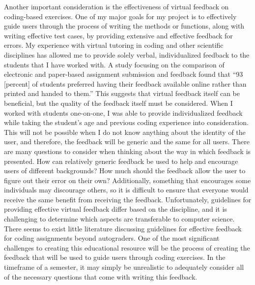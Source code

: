\documentclass[10pt,twocolumn]{article}
\begin{document}
Another important consideration is the effectiveness of virtual feedback on coding-based exercises. One of my major goals for my project is to effectively guide users through the process of writing the methods or functions, along with writing effective test cases, by providing extensive and effective feedback for errors. My experience with virtual tutoring in coding and other scientific disciplines has allowed me to provide solely verbal, individualized feedback to the students that I have worked with. A study focusing on the comparison of electronic and paper-based assignment submission and feedback found that “93 [percent] of students preferred having their feedback available online rather than printed and handed to them.”\cite{Feedback} This suggests that virtual feedback itself can be beneficial, but the quality of the feedback itself must be considered. When I worked with students one-on-one, I was able to provide individualized feedback while taking the student’s age and previous coding experience into consideration. This will not be possible when I do not know anything about the identity of the user, and therefore, the feedback will be generic and the same for all users. There are many questions to consider when thinking about the way in which feedback is presented. How can relatively generic feedback be used to help and encourage users of different backgrounds? How much should the feedback allow the user to figure out their error on their own? Additionally, something that encourages some individuals may discourage others, so it is difficult to ensure that everyone would receive the same benefit from receiving the feedback. Unfortunately, guidelines for providing effective virtual feedback differ based on the discipline, and it is challenging to determine which aspects are transferable to computer science. There seems to exist little literature discussing guidelines for effective feedback for coding assignments beyond autograders. One of the most significant challenges to creating this educational resource will be the process of creating the feedback that will be used to guide users through coding exercises. In the timeframe of a semester, it may simply be unrealistic to adequately consider all of the necessary questions that come with writing this feedback.
\end{document}
